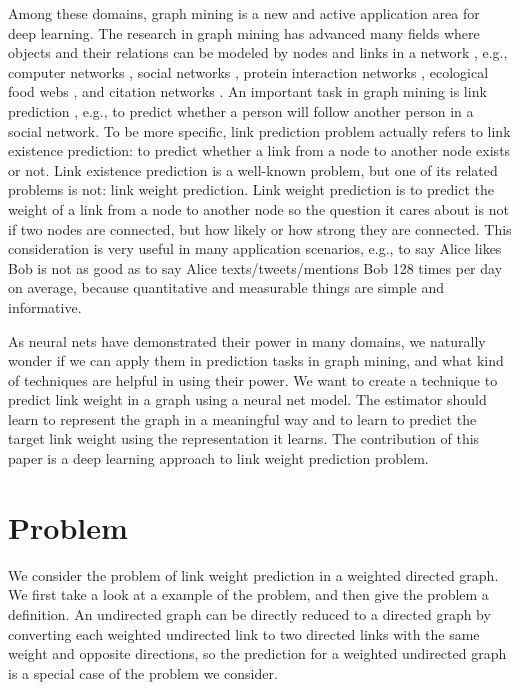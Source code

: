 \documentclass[conference]{IEEEtran}
\begin{document}
Among these domains,
graph mining is a new and active application area for deep learning.
The research in graph mining has advanced many fields
where objects and their relations can be modeled by nodes and links in a network \cite{chakrabarti2006graph}, e.g.,
computer networks \cite{bermond1995distributed},
social networks \cite{cook2006mining},
protein interaction networks \cite{bader2003automated},
ecological food webs \cite{brown2003ecological},
and citation networks \cite{greenberg2009citation}.
An important task in graph mining is link prediction \cite{liben2007link},
e.g., to predict whether a person will follow another person in a social network.
To be more specific,
link prediction problem actually refers to link existence prediction:
to predict whether a link from a node to another node exists or not.
Link existence prediction is a well-known problem,
but one of its related problems is not: link weight prediction.
Link weight prediction is
to predict the weight of a link from a node to another node
so the question it cares about is not if two nodes are connected,
but how likely or how strong they are connected.
This consideration is very useful in many application scenarios, e.g.,
to say Alice likes Bob is not as good as
to say Alice texts/tweets/mentions Bob 128 times per day on average,
because quantitative and measurable things are simple and informative.

As neural nets have demonstrated their power in many domains,
we naturally wonder if we can apply them in prediction tasks in graph mining,
and what kind of techniques are helpful in using their power.
We want to create a technique to predict link weight in a graph using a 
neural net model.
The estimator should learn to represent the graph in a meaningful way and to 
learn to predict the target link weight using the representation it learns.
The contribution of this paper is
a deep learning approach to link weight prediction problem.

\section{Problem}
We consider the problem of link weight prediction in a weighted directed graph.
We first take a look at a example of the problem,
and then give the problem a definition.
An undirected graph can be directly reduced to a directed graph by converting each weighted undirected link to two directed links with the same weight and opposite directions,
so the prediction for a weighted undirected graph is a special case of the problem we consider.
\end{document}
